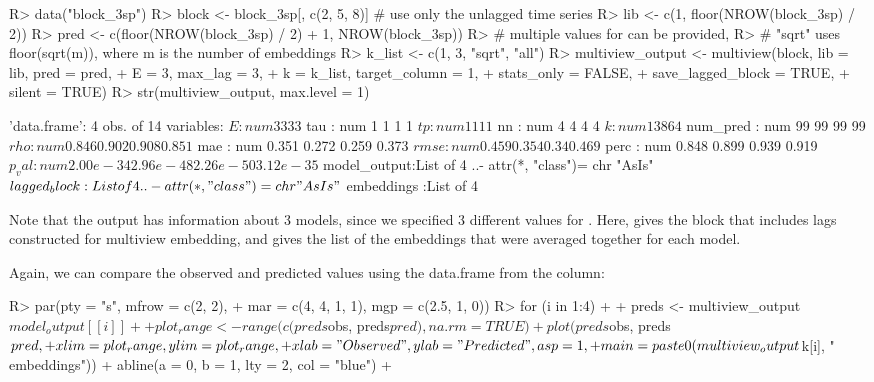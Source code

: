 \documentclass[article]{jss}
\begin{document}
\begin{Schunk}
\begin{Sinput}
R> data("block_3sp")
R> block <- block_3sp[, c(2, 5, 8)] # use only the unlagged time series
R> lib <- c(1, floor(NROW(block_3sp) / 2))
R> pred <- c(floor(NROW(block_3sp) / 2) + 1, NROW(block_3sp))
R> # multiple values for  can be provided, 
R> #   "sqrt" uses floor(sqrt(m)), where m is the number of embeddings
R> k_list <- c(1, 3, "sqrt", "all")
R> multiview_output <- multiview(block, lib = lib, pred = pred,
+                                E = 3, max_lag = 3, 
+                                k = k_list, target_column = 1, 
+                                stats_only = FALSE, 
+                                save_lagged_block = TRUE, 
+                                silent = TRUE)
R> str(multiview_output, max.level = 1)
\end{Sinput}
\begin{Soutput}
'data.frame':	4 obs. of  14 variables:
 $ E           : num  3 3 3 3
 $ tau         : num  1 1 1 1
 $ tp          : num  1 1 1 1
 $ nn          : num  4 4 4 4
 $ k           : num  1 3 8 64
 $ num_pred    : num  99 99 99 99
 $ rho         : num  0.846 0.902 0.908 0.851
 $ mae         : num  0.351 0.272 0.259 0.373
 $ rmse        : num  0.459 0.354 0.34 0.469
 $ perc        : num  0.848 0.899 0.939 0.919
 $ p_val       : num  2.00e-34 2.96e-48 2.26e-50 3.12e-35
 $ model_output:List of 4
  ..- attr(*, "class")= chr "AsIs"
 $ lagged_block:List of 4
  ..- attr(*, "class")= chr "AsIs"
 $ embeddings  :List of 4
\end{Soutput}
\end{Schunk}

Note that the output has information about 3 models, since we specified 3 different values for . Here,  gives the block that includes lags constructed for multiview embedding, and  gives the list of the embeddings that were averaged together for each model.

Again, we can compare the observed and predicted values using the data.frame from the  column:

\begin{Schunk}
\begin{Sinput}
R> par(pty = "s", mfrow = c(2, 2), 
+      mar = c(4, 4, 1, 1), mgp = c(2.5, 1, 0))
R> for (i in 1:4)
+  {
+      preds <- multiview_output$model_output[[i]]
+      
+      plot_range <- range(c(preds$obs, preds$pred), na.rm = TRUE)
+      plot(preds$obs, preds$pred, 
+           xlim = plot_range, ylim = plot_range,
+           xlab = "Observed", ylab = "Predicted", asp = 1, 
+           main = paste0(multiview_output$k[i], " embeddings"))
+      abline(a = 0, b = 1, lty = 2, col = "blue")
+  }
\end{Sinput}
\end{Schunk}
\end{document}
